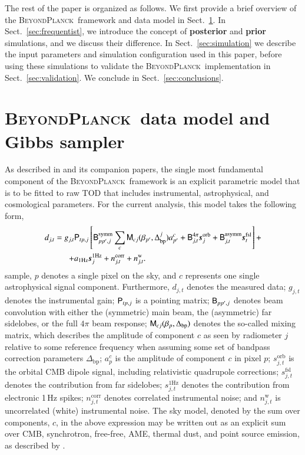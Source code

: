 \documentclass[twocolumn]{aa}%
\newcommand{\s}[0]{\vec{s}}
\newcommand{\B}[0]{\tens{B}}
\newcommand{\M}[0]{\tens{M}}
\renewcommand{\P}[0]{\tens{P}}
\newcommand{\Dbp}[0]{\Delta_{\mathrm{bp}}}
\newcommand{\BP}{\textsc{BeyondPlanck}}
\begin{document}
The rest of the paper is organized as follows. We first provide a
brief overview of the \BP\ framework and data model in
Sect.~\ref{sec:pipeline}. In Sect.~\ref{sec:frequentist}, we introduce
the concept of {\bf posterior} and {\bf prior} simulations, and we discuss
their difference. In Sect.~\ref{sec:simulation} we describe the input
parameters and simulation configuration used in this paper, before
using these simulations to validate the \BP\ implementation in
Sect.~\ref{sec:validation}.
We conclude in Sect.~\ref{sec:conclusions}.


\section{\BP\ data model and Gibbs sampler}
\label{sec:pipeline}

As described in \citet{bp01} and its companion papers, the single most
fundamental component of the \BP\ framework is an explicit parametric
model that is to be fitted to raw TOD that includes instrumental,
astrophysical, and cosmological parameters. For the current analysis,
this model takes the following form,
{\small
\begin{equation}
  \begin{split}
    d_{j,t} = g_{j,t}&\P_{tp,j}\left[\B^{\mathrm{symm}}_{pp',j}\sum_{c}
      \M_{cj}(\beta_{p'}, \Dbp^{j})a^c_{p'}  + \B^{4\pi}_{j,t}\s^{\mathrm{orb}}_{j}  
      + \B^{\mathrm{asymm}}_{j,t} \s^{\mathrm{fsl}}_{t} \right]
    +   \label{eq:todmodel} \\
    + &a_{\mathrm{1Hz}}\s^{\mathrm{1Hz}}_{j} + n^{\mathrm{corr}}_{j,t} + n^{\mathrm{w}}_{j,t}.
  \end{split}
\end{equation}
}%
sample, $p$ denotes a single pixel on the sky, and $c$ represents one
single astrophysical signal component. Furthermore, $d_{j,t}$ denotes
the measured data; $g_{j,t}$ denotes the instrumental gain;
$\P_{tp,j}$ is a pointing matrix; $\B_{pp',j}$ denotes beam
convolution with either the (symmetric) main beam, the (asymmetric)
far sidelobes, or the full $4\pi$ beam response; $\M_{cj}(\beta_{p},
\Dbp)$ denotes the so-called mixing matrix, which describes the
amplitude of component $c$ as seen by radiometer $j$ relative to some
reference frequency when assuming some set of bandpass
correction parameters $\Dbp$; $a^c_{p}$ is the amplitude of component
$c$ in pixel $p$; $s^{\mathrm{orb}}_{j,t}$ is the orbital CMB dipole
signal, including relativistic quadrupole corrections;
$s^{\mathrm{fsl}}_{j,t}$ denotes the contribution from far sidelobes;
$s^{\mathrm{1Hz}}_{j,t}$ denotes the contribution from electronic
1\,Hz spikes; $n^{\mathrm{corr}}_{j,t}$ denotes correlated
instrumental noise; and $n^{\mathrm{w}}_{j,t}$ is uncorrelated (white)
instrumental noise. The sky model, denoted by the sum over components,
$c$, in the above expression may be written out as an explicit sum over CMB, synchrotron, free-free, AME, thermal dust, and point source emission, as described by \citet{bp13,bp14}.
\end{document}
